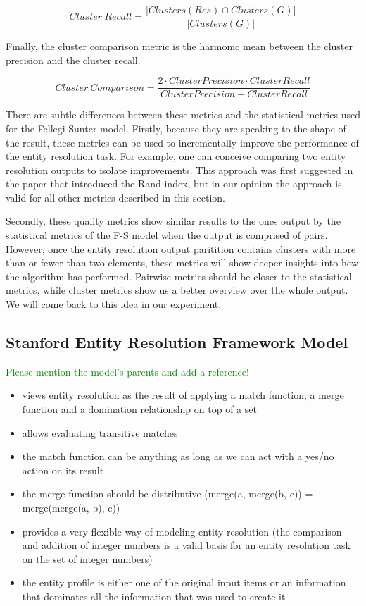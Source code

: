 \documentclass[11pt]{article}
\begin{document}
    \[
        Cluster~Recall = \frac{|Clusters(Res) \cap Clusters(G)|}{
            |Clusters(G)|
        }
    \]

    Finally, the cluster comparison metric is the harmonic mean between the
    cluster precision and the cluster recall.

    \[
        Cluster~Comparison = \frac{
            2 \cdot Cluster Precision \cdot Cluster Recall
        }{Cluster Precision + Cluster Recall}
    \]

    There are subtle differences between these metrics and the statistical
    metrics used for the Fellegi-Sunter model.
    Firstly, because they are speaking to the shape of the result, these metrics
    can be used to incrementally improve the performance of the entity
    resolution task.
    For example, one can conceive comparing two entity resolution outputs to
    isolate improvements.
    This approach was first suggested in the paper that introduced the Rand
    index\cite{rand1971}, but in our opinion the approach is valid for all other
    metrics described in this section.

    Secondly, these quality metrics show similar results to the ones output by
    the statistical metrics of the F-S model when the output is comprised of
    pairs.
    However, once the entity resolution output paritition contains clusters with
    more than or fewer than two elements, these metrics will show deeper
    insights into how the algorithm has performed.
    Pairwise metrics should be closer to the statistical metrics, while cluster
    metrics show us a better overview over the whole output.
    We will come back to this idea in our experiment.

    \subsection[serf]{Stanford Entity Resolution Framework Model}\label{subsec:serf}

    \textcolor{green}{Please mention the model's parents and add a reference!}
    \begin{itemize}
        \item views entity resolution as the result of applying a match function, a merge function and a domination relationship on top of a set
        \item allows evaluating transitive matches
        \item the match function can be anything as long as we can act with a yes/no action on its result
        \item the merge function should be distributive (merge(a, merge(b, c)) = merge(merge(a, b), c))
        \item provides a very flexible way of modeling entity resolution (the comparison and addition of integer numbers is a valid basis for an entity resolution task on the set of integer numbers)
        \item the entity profile is either one of the original input items or an information that dominates all the information that was used to create it
    \end{itemize}
\end{document}
